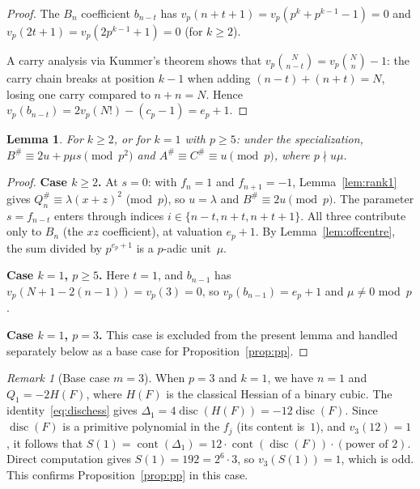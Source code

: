 \documentclass[10pt]{amsart}
\newtheorem{lemma}[theorem]{Lemma}
\theoremstyle{definition}
\theoremstyle{remark}
\newtheorem*{remark}{Remark}
\DeclareMathOperator{\cont}{cont}
\DeclareMathOperator{\disc}{disc}
\begin{document}
\begin{proof}
The $B_n$ coefficient $b_{n-t}$ has
$v_p(n+t+1) = v_p(p^k+p^{k-1}-1) = 0$ and
$v_p(2t+1) = v_p(2p^{k-1}+1) = 0$ (for $k \ge 2$).

A carry analysis via Kummer's theorem shows that
$v_p\binom{N}{n-t} = v_p\binom{N}{n} - 1$: the carry chain breaks at
position $k-1$ when adding $(n-t)+(n+t) = N$, losing one carry compared
to $n+n = N$.  Hence $v_p(b_{n-t}) = 2v_p(N!) - (c_p - 1) = e_p + 1$.
\end{proof}

\begin{lemma}\label{lem:deform}
For $k \ge 2$, or for $k = 1$ with $p \ge 5$: under the specialization,
$B^{\#} \equiv 2u + p\mu s \pmod{p^2}$ and
$A^{\#} \equiv C^{\#} \equiv u \pmod{p}$, where $p \nmid u\mu$.
\end{lemma}

\begin{proof}
\textbf{Case $k \ge 2$.}
At $s=0$: with $f_n = 1$ and $f_{n+1} = -1$,
Lemma~\ref{lem:rank1} gives $Q_n^{\#} \equiv \lambda(x+z)^2$ (mod~$p$),
so $u=\lambda$ and $B^\# \equiv 2u \pmod{p}$.
The parameter $s = f_{n-t}$ enters through indices $i \in \{n-t, n+t, n+t+1\}$.
All three contribute only to $B_n$ (the $xz$ coefficient), at valuation
$e_p + 1$.  By Lemma~\ref{lem:offcentre}, the sum divided by $p^{e_p+1}$
is a $p$-adic unit~$\mu$.

\textbf{Case $k = 1$, $p \ge 5$.}
Here $t = 1$, and $b_{n-1}$ has $v_p(N+1-2(n-1)) = v_p(3) = 0$, so
$v_p(b_{n-1}) = e_p + 1$ and $\mu \ne 0$ mod~$p$.

\textbf{Case $k = 1$, $p = 3$.}
This case is excluded from the present lemma and handled separately
below as a base case for Proposition~\ref{prop:pp}.
\end{proof}

\begin{remark}[Base case $m = 3$]\label{rem:base-case-3}
When $p = 3$ and $k = 1$, we have $n = 1$ and $Q_1 = -2H(F)$, where
$H(F)$ is the classical Hessian of a binary cubic.  The
identity~\eqref{eq:dischess} gives $\Delta_1 = 4\disc(H(F)) = -12\disc(F)$.
Since $\disc(F)$ is a primitive polynomial in the $f_j$ (its content is~$1$),
and $v_3(12) = 1$, it follows that $S(1) = \cont(\Delta_1) = 12 \cdot
\cont(\disc(F)) \cdot (\text{power of }2)$.
Direct computation gives $S(1) = 192 = 2^6 \cdot 3$, so
$v_3(S(1)) = 1$, which is odd.  This confirms
Proposition~\ref{prop:pp} in this case.
\end{remark}
\end{document}
